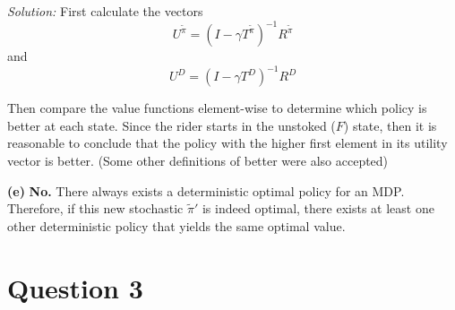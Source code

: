 \documentclass{article}
\theoremstyle{definition}
\newenvironment{solution}{\noindent\textit{Solution:}}{}
\begin{document}
\begin{solution}
First calculate the vectors
\[
U^{\tilde{\pi}} = (I - \gamma T^{\tilde{\pi}})^{-1} R^{\tilde{\pi}}
\]
and
\[
U^D = (I - \gamma T^D)^{-1} R^D
\]

Then compare the value functions element-wise to determine which policy is better at each state. Since the rider starts in the unstoked ($F$) state, then it is reasonable to conclude that the policy with the higher first element in its utility vector is better. (Some other definitions of better were also accepted)

\textbf{(e)}
\textbf{No.} There always exists a deterministic optimal policy for an MDP. Therefore, if this new stochastic $\tilde{\pi}'$ is indeed optimal, there exists at least one other deterministic policy that yields the same optimal value.



\end{solution}

\newpage
\section*{Question 3}
\end{document}
